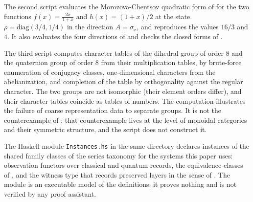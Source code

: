 \documentclass[11pt,letterpaper]{article}
\theoremstyle{definition}
\theoremstyle{remark}
\begin{document}
The second script evaluates the Morozova-Chentsov quadratic form of  for the two functions $f(x) = \tfrac{2x}{1+x}$ and $h(x) = (1+x)/2$ at the state $\rho = \mathrm{diag}(3/4, 1/4)$ in the direction $A = \sigma_x$, and reproduces the values $16/3$ and $4$. It also evaluates the four directions of  and checks the closed forms of .

The third script computes character tables of the dihedral group of order 8 and the quaternion group of order 8 from their multiplication tables, by brute-force enumeration of conjugacy classes, one-dimensional characters from the abelianization, and completion of the table by orthogonality against the regular character. The two groups are not isomorphic (their element orders differ), and their character tables coincide as tables of numbers. The computation illustrates the failure of coarse representation data to separate groups. It is not the counterexample of : that counterexample lives at the level of monoidal categories and their symmetric structure, and the script does not construct it.

The Haskell module \texttt{Instances.hs} in the same directory declares instances of the shared family classes of the series taxonomy for the systems this paper uses: observation functors over classical and quantum records, the equivalence classes of , and the witness type that records preserved layers in the sense of . The module is an executable model of the definitions; it proves nothing and is not verified by any proof assistant.
\end{document}
